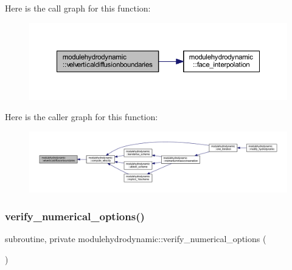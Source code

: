 Here is the call graph for this function\+:\nopagebreak
\begin{figure}[H]
\begin{center}
\leavevmode
\includegraphics[width=350pt]{namespacemodulehydrodynamic_a10da15941f53c4274a4bfa5fec56a6ad_cgraph}
\end{center}
\end{figure}
Here is the caller graph for this function\+:\nopagebreak
\begin{figure}[H]
\begin{center}
\leavevmode
\includegraphics[width=350pt]{namespacemodulehydrodynamic_a10da15941f53c4274a4bfa5fec56a6ad_icgraph}
\end{center}
\end{figure}
\mbox{\label{namespacemodulehydrodynamic_a7c3dd39beec17720b08c54e61c02ecc8}} 
\subsubsection{\texorpdfstring{verify\+\_\+numerical\+\_\+options()}{verify\_numerical\_options()}}
{\footnotesize\ttfamily subroutine, private modulehydrodynamic\+::verify\+\_\+numerical\+\_\+options (\begin{DoxyParamCaption}{ }\end{DoxyParamCaption})\hspace{0.3cm}{\ttfamily [private]}}

